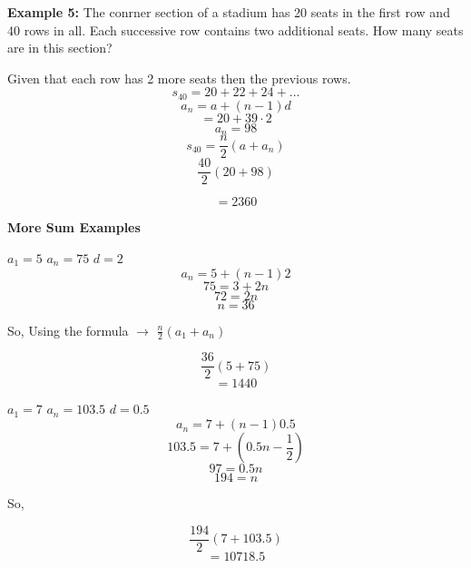 \documentclass{report}
\begin{document}
\begin{large}
	\noindent \textbf{Example 5:}
	The conrner section of a stadium has 20 seats in the first row and 40 rows in all. Each successive row contains two additional seats. How many seats are in this section?
\end{large}
\vspace{4mm}


Given that each row has 2 more seats then the previous rows.
$$s_{40} = 20 +22+24+\ldots$$
$$a_n = a +(n-1)d$$
$$ = 20 +39 \cdot 2$$
$$a_n = 98$$
$$s_{40} = \frac{n}{2}(a+a_n)$$
$$\frac{40}{2}(20+98)$$

$$ = \boxed{2360}$$
\newpage
\begin{LARGE}
 \begin{center}
	 \textbf{More Sum Examples}
 \end{center} 
\end{LARGE}
\bigbreak \noindent \bigbreak \noindent
{}
\bigbreak \noindent
\begin{center}
 \begin{large}
	 $a_1 = 5$ \hspace{5mm} $a_n = 75$ \hspace{5mm} $d = 2$
	$$ a_n = 5 +(n-1)2$$
	$$75 = 3 +2n$$
	$$72 = 2n$$
	$$ n = 36$$
 \end{large} 
\end{center}
\vspace{2mm}
\begin{large}
	So, Using the formula $\rightarrow$ $\frac{n}{2}\left(a_1 + a_n\right)$
 \vspace{2mm}

	$$\frac{36}{2}\left(5 + 75\right)$$
$$ =1440$$
\end{large}
\bigbreak \noindent \bigbreak \noindent
{}

\bigbreak \noindent
\begin{large}
\begin{center}
	$a_1 = 7$ \hspace{5mm} $a_n = 103.5$ \hspace{5mm} $d = 0.5$
	\vspace{2mm}
	$$a_n = 7 +(n-1)0.5$$
	$$103.5 = 7 + \left(0.5n -\frac{1}{2}\right)$$
	$$97 = 0.5n$$
	$$194 = n$$
\end{center}
\end{large}

\begin{large}
 So,
\end{large}
\begin{large}

$$\frac{194}{2}\left(7 + 103.5\right)$$
$$ = 10718.5$$
\end{large}
\end{document}
